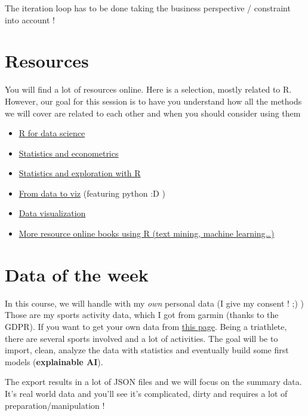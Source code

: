 \documentclass[
]{book}
\providecommand{\tightlist}{%
  \setlength{\itemsep}{0pt}\setlength{\parskip}{0pt}}
\begin{document}
The iteration loop has to be done taking the business perspective / constraint into account !

\hypertarget{resources}{%
\section{Resources}\label{resources}}

You will find a lot of resources online. Here is a selection, mostly related to R. However, our goal for this session is to have you understand how all the methods we will cover are related to each other and when you should consider using them

\begin{itemize}
\tightlist
\item
  \href{https://r4ds.had.co.nz/}{R for data science}
\item
  \href{https://www.econometrics-with-r.org/}{Statistics and econometrics}
\item
  \href{https://moderndive.com/}{Statistics and exploration with R}
\item
  \href{https://www.data-to-viz.com/}{From data to viz} (featuring python :D )
\item
  \href{https://socviz.co/}{Data visualization}
\item
  \href{https://bookdown.org/home/}{More resource online books using R (text mining, machine learning\ldots)}
\end{itemize}

\hypertarget{data-of-the-week}{%
\section{Data of the week}\label{data-of-the-week}}

In this course, we will handle with my \emph{own} personal data (I give my consent ! ;) )
Those are my sports activity data, which I got from garmin (thanks to the GDPR). If you want to get your own data from \href{https://www.garmin.com/en-US/account/datamanagement/exportdata/}{this page}.
Being a triathlete, there are several sports involved and a lot of activities. The goal will be to import, clean, analyze the data with statistics and eventually build some first models (\textbf{explainable AI}).

The export results in a lot of JSON files and we will focus on the summary data. It's real world data and you'll see it's complicated, dirty and requires a lot of preparation/manipulation !
\end{document}
